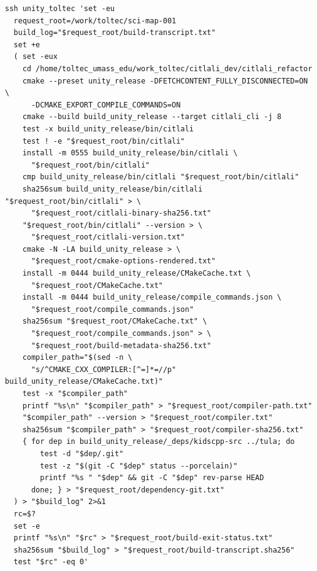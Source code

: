 \documentclass[11pt]{article}
\begin{document}
\begin{small}
\begin{verbatim}
ssh unity_toltec 'set -eu
  request_root=/work/toltec/sci-map-001
  build_log="$request_root/build-transcript.txt"
  set +e
  ( set -eux
    cd /home/toltec_umass_edu/work_toltec/citlali_dev/citlali_refactor
    cmake --preset unity_release -DFETCHCONTENT_FULLY_DISCONNECTED=ON \
      -DCMAKE_EXPORT_COMPILE_COMMANDS=ON
    cmake --build build_unity_release --target citlali_cli -j 8
    test -x build_unity_release/bin/citlali
    test ! -e "$request_root/bin/citlali"
    install -m 0555 build_unity_release/bin/citlali \
      "$request_root/bin/citlali"
    cmp build_unity_release/bin/citlali "$request_root/bin/citlali"
    sha256sum build_unity_release/bin/citlali "$request_root/bin/citlali" > \
      "$request_root/citlali-binary-sha256.txt"
    "$request_root/bin/citlali" --version > \
      "$request_root/citlali-version.txt"
    cmake -N -LA build_unity_release > \
      "$request_root/cmake-options-rendered.txt"
    install -m 0444 build_unity_release/CMakeCache.txt \
      "$request_root/CMakeCache.txt"
    install -m 0444 build_unity_release/compile_commands.json \
      "$request_root/compile_commands.json"
    sha256sum "$request_root/CMakeCache.txt" \
      "$request_root/compile_commands.json" > \
      "$request_root/build-metadata-sha256.txt"
    compiler_path="$(sed -n \
      "s/^CMAKE_CXX_COMPILER:[^=]*=//p" build_unity_release/CMakeCache.txt)"
    test -x "$compiler_path"
    printf "%s\n" "$compiler_path" > "$request_root/compiler-path.txt"
    "$compiler_path" --version > "$request_root/compiler.txt"
    sha256sum "$compiler_path" > "$request_root/compiler-sha256.txt"
    { for dep in build_unity_release/_deps/kidscpp-src ../tula; do
        test -d "$dep/.git"
        test -z "$(git -C "$dep" status --porcelain)"
        printf "%s " "$dep" && git -C "$dep" rev-parse HEAD
      done; } > "$request_root/dependency-git.txt"
  ) > "$build_log" 2>&1
  rc=$?
  set -e
  printf "%s\n" "$rc" > "$request_root/build-exit-status.txt"
  sha256sum "$build_log" > "$request_root/build-transcript.sha256"
  test "$rc" -eq 0'


\end{verbatim}
\end{small}
\end{document}
